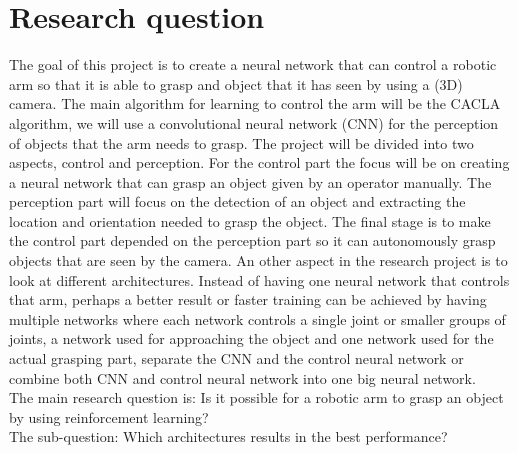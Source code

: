 \section{Research question}
The goal of this project is to create a neural network that can control a robotic arm so that it is able to grasp and object that it has seen by using a (3D) camera. 
The main algorithm for learning to control the arm will be the CACLA algorithm, we will use a convolutional neural network (CNN) for the perception of objects that the arm needs to grasp. 
The project will be divided into two aspects, control and perception. For the control part the focus will be on creating a neural network that can grasp an object given by an operator manually. The perception part 
will focus on the detection of an object and extracting the location and orientation needed to grasp the object. The final stage is to make the control part depended on the perception part so it can autonomously grasp objects
that are seen by the camera. An other aspect in the research project is to look at different architectures. Instead of having one neural network that controls that arm, perhaps a better result or faster training can be 
achieved by having multiple networks where each network controls a single joint or smaller groups of joints, a network used for approaching the object and one network used for the actual grasping part, separate the CNN and 
the control neural network or combine both CNN and control neural network into one big neural network. \\
The main research question is: Is it possible for a robotic arm to grasp an object by using reinforcement learning? \\
The sub-question: Which architectures results in the best performance? 